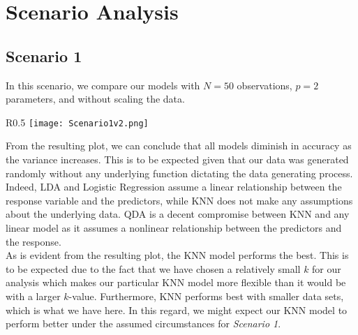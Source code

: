 \documentclass[11pt, oneside]{article}
\begin{document}

\section{Scenario Analysis}
\subsection{Scenario 1}


In this scenario, we compare our models with $N=50$ observations, $p=2$ parameters, and without scaling the data.
\begin{wrapfigure}[]{R}{0.5\textwidth}
\vspace{-0.55cm}
\texttt{[image: Scenario1v2.png]}
\vspace{-.55cm}
\end{wrapfigure}

From the resulting plot, we can conclude that all models diminish in accuracy as the variance increases. This is to be expected given that our data was generated randomly without any underlying function dictating the data generating process. Indeed, LDA and Logistic Regression assume a linear relationship between the response variable and the predictors, while KNN does not make any assumptions about the underlying data. QDA is a decent compromise between KNN and any linear model as it assumes a nonlinear relationship between the predictors and the response.\\


As is evident from the resulting plot, the KNN model performs the best. This is to be expected due to the fact that we have chosen a relatively small $k$ for our analysis which makes our particular KNN model more flexible than it would be with a larger $k$-value. Furthermore, KNN performs best with smaller data sets, which is what we have here. In this regard, we might expect our KNN model to perform better under the assumed circumstances for \emph{Scenario 1}.
\end{document}
